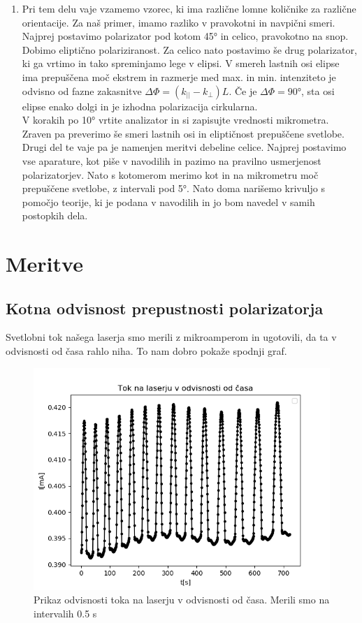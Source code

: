 \documentclass[11pt, a4paper]{article}
\theoremstyle{definition}
\theoremstyle{example}
\theoremstyle{izrek}
\begin{document}
\begin{enumerate}
\item Pri tem delu vaje vzamemo vzorec, ki ima različne lomne količnike za različne orientacije. Za naš primer, imamo razliko v pravokotni in navpični smeri.
Najprej postavimo polarizator pod kotom 45° in celico, pravokotno na snop. Dobimo eliptično polariziranost. Za celico nato postavimo še drug polarizator, ki ga vrtimo in tako spreminjamo lege v elipsi. V smereh lastnih osi elipse ima prepuščena moč ekstrem in razmerje med max. in min. intenziteto je odvisno od fazne zakasnitve $\Delta \Phi =(k_{||} -k_{\perp})L$. Če je $\Delta \Phi=90°$, sta osi elipse enako dolgi in je izhodna polarizacija cirkularna. \\
V korakih po 10° vrtite analizator in si zapisujte vrednosti mikrometra. Zraven pa preverimo še smeri lastnih osi in eliptičnost prepuščene svetlobe. \\
Drugi del te vaje pa je namenjen meritvi debeline celice. Najprej postavimo vse aparature, kot piše v navodilih in pazimo na pravilno usmerjenost polarizatorjev. Nato s kotomerom merimo kot in na mikrometru moč prepuščene svetlobe, z intervali pod 5°. Nato doma narišemo krivuljo s pomočjo teorije, ki je podana v navodilih in jo bom navedel v samih postopkih dela. 
\end{enumerate}

\section{Meritve}
\subsection{Kotna odvisnost prepustnosti polarizatorja}

Svetlobni tok našega laserja smo merili z mikroamperom in  ugotovili, da ta v odvisnosti od časa rahlo niha. To nam dobro pokaže spodnji graf.
\begin{figure}[H]
	\centering
    \includegraphics[width=12cm]{Tok_čas,dioda.png}
    \caption{Prikaz odvisnosti toka na laserju v odvisnosti od časa. Merili smo na intervalih 0.5 s}
\end{figure}
\end{document}
